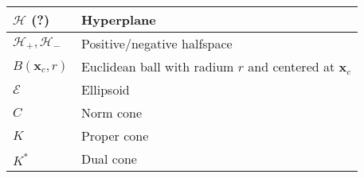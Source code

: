 \begin{xltabular}{\textwidth}{XX}
	\(\mathcal{H}\) (?)                                                                                                                                                   & Hyperplane                                                                                                                                                                                                     \\ \hline
	\(\mathcal{H}_{+}, \mathcal{H}_{-}\) \cite[sec. 2.4]{dattorroConvexOptimizationEuclidean2010}                                                                         & Positive/negative halfspace                                                                                                                                                                                    \\ \hline
	\(B(\mathbf{x}_c, r)\) \cite[sec. 2.2.2]{boydAdditionalExercisesConvex}                                                                                               & Euclidean ball with radium \(r\) and centered at \(\mathbf{x}_c\)                                                                                                                                              \\ \hline
	\(\mathcal{E}\) \cite[sec. 2.2.2]{boydAdditionalExercisesConvex}                                                                                                      & Ellipsoid                                                                                                                                                                                                      \\ \hline
	\(C\) \cite[sec. 2.2.3]{boydConvexOptimization2004}                                                                                                                   & Norm cone                                                                                                                                                                                                      \\ \hline
	\(K\) \cite[sec. 2.4]{boydAdditionalExercisesConvex}                                                                                                                  & Proper cone                                                                                                                                                                                                    \\ \hline
	\(K^*\) \cite[sec. 2.6]{boydConvexOptimization2004}                                                                                                                   & Dual cone                                                                                                                                                                                                      \\ \hline

\end{xltabular}
